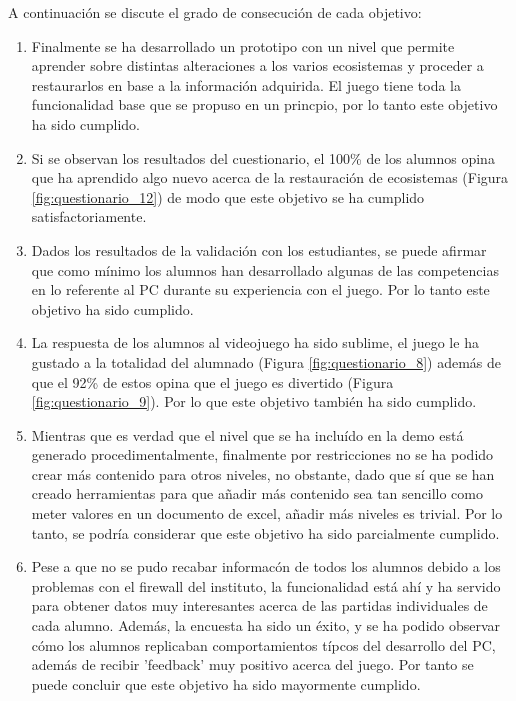 A continuación se discute el grado de consecución de cada objetivo:
\begin{enumerate}[itemsep=0mm]

\item Finalmente se ha desarrollado un prototipo con un nivel que permite aprender sobre distintas alteraciones a los varios ecosistemas
 y proceder a restaurarlos en base a la información adquirida. El juego tiene toda la funcionalidad base que se propuso en un princpio,
  por lo tanto este objetivo ha sido cumplido.
  
\item Si se observan los resultados del cuestionario, el 100\% de los alumnos opina que ha aprendido algo nuevo acerca de la restauración de ecosistemas
(Figura \ref{fig:questionario_12}) de modo que este objetivo se ha cumplido satisfactoriamente.

\item Dados los resultados de la validación con los estudiantes, se puede afirmar que como mínimo los alumnos han desarrollado 
algunas de las competencias en lo referente al PC durante su experiencia con el juego. Por lo tanto este objetivo ha sido cumplido.

\item La respuesta de los alumnos al videojuego ha sido sublime, el juego le ha gustado a la totalidad del alumnado (Figura \ref{fig:questionario_8}) 
además de que el 92\% de estos opina que el juego es divertido (Figura \ref{fig:questionario_9}). Por lo que este objetivo también ha sido cumplido.

\item Mientras que es verdad que el nivel que se ha incluído en la demo está generado procedimentalmente, finalmente por restricciones no se ha podido
 crear más contenido para otros niveles, no obstante, dado que sí que se han creado herramientas para que añadir más contenido sea tan sencillo como 
 meter valores en un documento de excel, añadir más niveles es trivial. Por lo tanto, se podría considerar que este objetivo ha sido parcialmente cumplido. 

\item Pese a que no se pudo recabar informacón de todos los alumnos debido a los problemas con el firewall del instituto, la funcionalidad está ahí y
 ha servido para obtener datos muy interesantes acerca de las partidas individuales de cada alumno. Además, la encuesta ha sido un éxito, y se ha podido
  observar cómo los alumnos replicaban comportamientos típcos del desarrollo del PC, además de recibir 'feedback' muy positivo acerca del juego.
   Por tanto se puede concluir que este objetivo ha sido mayormente cumplido.
\end{enumerate}

